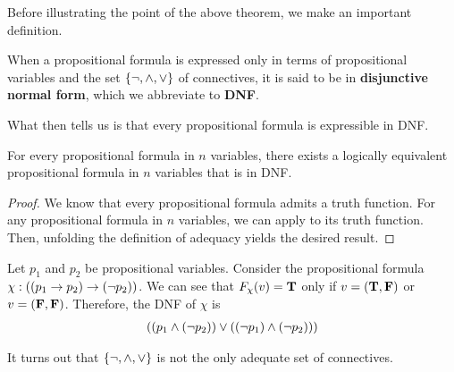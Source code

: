 Before illustrating the point of the above theorem, we make an important definition.

\begin{boxdefinition}
    When a propositional formula is expressed only in terms of propositional variables and the set $\left\{ \neg, \land, \lor \right\}$ of connectives, it is said to be in \textbf{disjunctive normal form}, which we abbreviate to \textbf{DNF}.
\end{boxdefinition}

What  then tells us is that every propositional formula is expressible in DNF.

\begin{boxcorollary}
    For every propositional formula in $n$ variables, there exists a logically equivalent propositional formula in $n$ variables that is in DNF.
\end{boxcorollary}
\begin{proof}
    We know that every propositional formula admits a truth function. For any propositional formula in $n$ variables, we can apply  to its truth function. Then, unfolding the definition of adequacy yields the desired result.
\end{proof}

\begin{boxexample}
    Let $p_1$ and $p_2$ be propositional variables. Consider the propositional formula $\chi : \left( \left( p_1 \to p_2 \right) \to \left( \neg p_2 \right) \right)$. We can see that $F_{\chi}(v) = \mathbf{T}$ only if $v = \left( \mathbf{T}, \mathbf{F} \right)$ or $v = \left( \mathbf{F}, \mathbf{F} \right)$. Therefore, the DNF of $\chi$ is
    \begin{align*}
        \left( \left( p_1 \land \left( \neg p_2 \right) \right) \lor \left( \left( \neg p_1 \right) \land \left( \neg p_2 \right) \right) \right)
    \end{align*}
\end{boxexample}

It turns out that $\left\{ \neg, \land, \lor \right\}$ is not the only adequate set of connectives.

